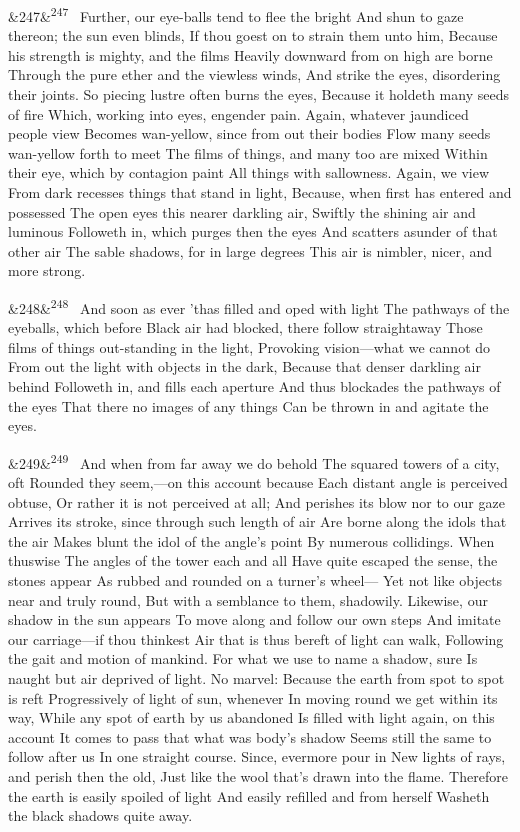 \documentclass[12pt]{article}
\newcommand{\para}[1][]{\par\noindent\ifx&#1&\else\textsuperscript{\footnotesize #1}~\fi}
\begin{document}
\para[247] Further, our eye-balls tend to flee the bright And shun to gaze thereon; the sun even blinds, If thou goest on to strain them unto him, Because his strength is mighty, and the films Heavily downward from on high are borne Through the pure ether and the viewless winds, And strike the eyes, disordering their joints. So piecing lustre often burns the eyes, Because it holdeth many seeds of fire Which, working into eyes, engender pain. Again, whatever jaundiced people view Becomes wan-yellow, since from out their bodies Flow many seeds wan-yellow forth to meet The films of things, and many too are mixed Within their eye, which by contagion paint All things with sallowness. Again, we view From dark recesses things that stand in light, Because, when first has entered and possessed The open eyes this nearer darkling air, Swiftly the shining air and luminous Followeth in, which purges then the eyes And scatters asunder of that other air The sable shadows, for in large degrees This air is nimbler, nicer, and more strong.

\para[248] And soon as ever 'thas filled and oped with light The pathways of the eyeballs, which before Black air had blocked, there follow straightaway Those films of things out-standing in the light, Provoking vision---what we cannot do From out the light with objects in the dark, Because that denser darkling air behind Followeth in, and fills each aperture And thus blockades the pathways of the eyes That there no images of any things Can be thrown in and agitate the eyes.

\para[249] And when from far away we do behold The squared towers of a city, oft Rounded they seem,---on this account because Each distant angle is perceived obtuse, Or rather it is not perceived at all; And perishes its blow nor to our gaze Arrives its stroke, since through such length of air Are borne along the idols that the air Makes blunt the idol of the angle's point By numerous collidings. When thuswise The angles of the tower each and all Have quite escaped the sense, the stones appear As rubbed and rounded on a turner's wheel--- Yet not like objects near and truly round, But with a semblance to them, shadowily. Likewise, our shadow in the sun appears To move along and follow our own steps And imitate our carriage---if thou thinkest Air that is thus bereft of light can walk, Following the gait and motion of mankind. For what we use to name a shadow, sure Is naught but air deprived of light. No marvel: Because the earth from spot to spot is reft Progressively of light of sun, whenever In moving round we get within its way, While any spot of earth by us abandoned Is filled with light again, on this account It comes to pass that what was body's shadow Seems still the same to follow after us In one straight course. Since, evermore pour in New lights of rays, and perish then the old, Just like the wool that's drawn into the flame. Therefore the earth is easily spoiled of light And easily refilled and from herself Washeth the black shadows quite away.
\end{document}
